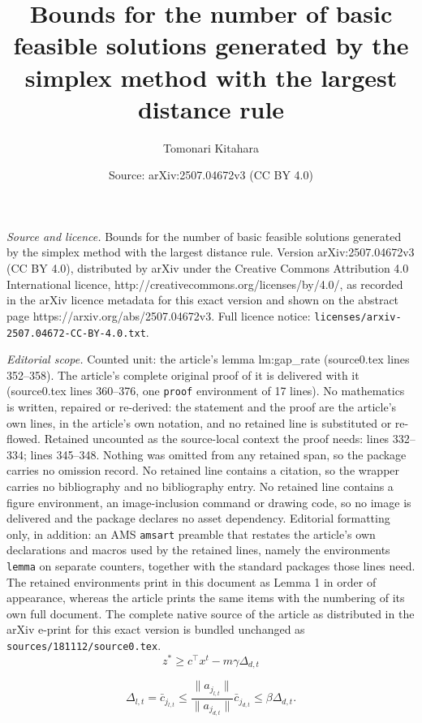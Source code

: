 \documentclass[10pt,a4paper]{amsart}
\title{Bounds for the number of basic feasible solutions generated by the simplex method with the largest distance rule}
\author{Tomonari Kitahara}
\date{Source: arXiv:2507.04672v3 (CC BY 4.0)}
\begin{document}
\maketitle

\noindent\emph{Source and licence.} Bounds for the number of basic feasible solutions generated by the simplex method with the largest distance rule. Version arXiv:2507.04672v3 (CC BY 4.0), distributed by arXiv under the Creative Commons Attribution 4.0 International licence, http://creativecommons.org/licenses/by/4.0/, as recorded in the arXiv licence metadata for this exact version and shown on the abstract page https://arxiv.org/abs/2507.04672v3. Full licence notice: \texttt{licenses/arxiv-2507.04672-CC-BY-4.0.txt}.\par\smallskip

\noindent\textit{Editorial scope.} Counted unit: the article's lemma lm:gap\_rate (source0.tex lines 352--358). The article's complete original proof of it is delivered with it (source0.tex lines 360--376, one \texttt{proof} environment of 17 lines). No mathematics is written, repaired or re-derived: the statement and the proof are the article's own lines, in the article's own notation, and no retained line is substituted or re-flowed.  Retained uncounted as the source-local context the proof needs: lines 332--334; lines 345--348.  Nothing was omitted from any retained span, so the package carries no omission record.  No retained line contains a citation, so the wrapper carries no bibliography and no bibliography entry.  No retained line contains a figure environment, an image-inclusion command or drawing code, so no image is delivered and the package declares no asset dependency.  Editorial formatting only, in addition: an AMS \texttt{amsart} preamble that restates the article's own declarations and macros used by the retained lines, namely the environments \texttt{lemma} on separate counters, together with the standard packages those lines need.  The retained environments print in this document as Lemma 1 in order of appearance, whereas the article prints the same items with the numbering of its own full document.  The complete native source of the article as distributed in the arXiv e-print for this exact version is bundled unchanged as \texttt{sources/181112/source0.tex}.
\begin{equation} \label{eq:Lower-Bound-Of-Optimal-Value}
  z^* \ge c^{\top} x^t - m \gamma \Delta_{d,t}
\end{equation}

\begin{equation}
\Delta_{l,t}=\bar{c}_{j_{l,t}}\le \frac{\|a_{j_{l,t}}\|}{\|a_{j_{d,t}}\|}\bar{c}_{j_{d,t}}\le \beta \Delta_{d,t}.
\label{estimate}
\end{equation} 
\end{document}
